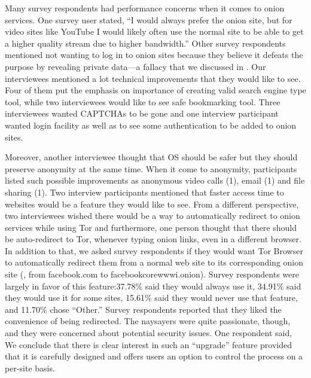 Many survey respondents had performance concerns when it comes to onion services.   One survey user stated, ``I would
always prefer the onion site, but for video sites like YouTube I would likely
often use the normal site to be able to get a higher quality stream due to
higher bandwidth.'' Other survey respondents mentioned not wanting to log in to onion sites
because they believe it defeats the purpose by revealing private data---a fallacy that we discussed in
.  Our interviewees mentioned a lot technical improvements that they would like to see. Four of them put the emphasis on importance of creating valid search engine type tool, while two interviewees would like to see safe bookmarking tool.  Three interviewees wanted CAPTCHAs to be gone and one interview participant wanted login facility as well as to see some authentication to be added to onion sites. 

Moreover, another interviewee thought that OS should be safer but they should preserve anonymity at the same time. When it come to anonymity, participants listed such possible improvements as anonymous video calls (1), email (1) and file sharing (1). Two interview participants mentioned that faster access time to websites would be a feature they would like to see. From a different perspective, two interviewees wished there would be a way to automatically redirect to onion services while using Tor and furthermore, one person thought that there should be auto-redirect to Tor, whenever typing onion links, even in a different browser. In addition to that, we asked survey respondents if they would want Tor Browser to automatically redirect them from
a normal web site to its corresponding onion site (\eg, from facebook.com to
facebookcorewwwi.onion). Survey respondents were largely
in favor of this feature:37.78\% said they would always use it, 34.91\% said
they would use it for some sites, 15.61\% said they would never use that feature,   and
11.70\% chose ``Other.'' Survey respondents reported that they liked the convenience of being redirected.
The naysayers were quite passionate, though, and they were concerned about
potential security issues. One respondent said, 
We conclude that there is clear interest in such an ``upgrade'' feature provided
that it is carefully designed and offers users an option to control the process
on a per-site basis.


